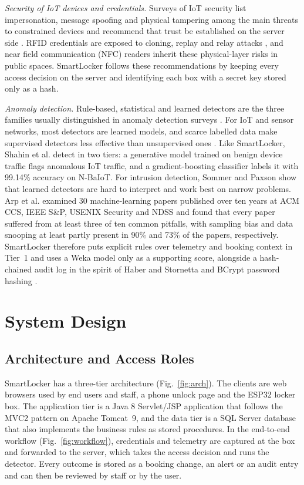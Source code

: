 \documentclass[journal,onecolumn]{IEEEtran}
\begin{document}
\textit{Security of IoT devices and credentials.} Surveys of IoT security list impersonation, message spoofing and
physical tampering among the main threats to constrained devices \cite{roman2013features} and recommend that trust be
established on the server side \cite{sicari2015security}. RFID credentials are exposed to cloning, replay and relay
attacks \cite{mitrokotsa2010rfid}, and near field communication (NFC) readers inherit these physical-layer risks in
public spaces. SmartLocker follows these recommendations by keeping every
access decision on the server and identifying each box with a secret key stored only as a hash.

\textit{Anomaly detection.} Rule-based, statistical and learned detectors are the three families usually distinguished
in anomaly detection surveys \cite{chandola2009anomaly}. For IoT and sensor networks, most detectors are learned
models, and scarce labelled data make supervised detectors less effective than unsupervised ones
\cite{demedeiros2023anomaly}. Like SmartLocker, Shahin et al. \cite{shahin2025twostage} detect in two
tiers: a generative model trained on benign device traffic flags anomalous IoT traffic, and a gradient-boosting
classifier labels it with 99.14\% accuracy on N-BaIoT. For intrusion detection, Sommer and Paxson
\cite{sommer2010outside} show that learned detectors are hard to interpret and work best on narrow problems. Arp et
al. \cite{arp2022dos} examined 30 machine-learning papers published over ten years at ACM CCS, IEEE S\&P, USENIX
Security and NDSS and found that every paper suffered from at least three of ten common pitfalls, with sampling bias
and data snooping at least partly present in 90\% and 73\% of the papers, respectively. SmartLocker therefore puts
explicit rules over telemetry and booking context in Tier~1 and uses a Weka model \cite{hall2009weka} only as a
supporting score, alongside a hash-chained audit log in the spirit of Haber and Stornetta \cite{haber1991timestamp}
and BCrypt password hashing \cite{provos1999bcrypt}.

\section{System Design}

\subsection{Architecture and Access Roles}

SmartLocker has a three-tier architecture (Fig.~\ref{fig:arch}). The clients are web browsers used by end users and
staff, a phone unlock page and the ESP32 locker box. The application tier is a Java 8 Servlet/JSP application that
follows the MVC2 pattern on Apache Tomcat~9, and the data tier is a SQL Server database that also implements the
business rules as stored procedures. In the end-to-end workflow (Fig.~\ref{fig:workflow}), credentials and telemetry
are captured at the box and forwarded to the server, which takes the access decision and runs the detector. Every
outcome is stored as a booking change, an alert or an audit entry and can then be reviewed by staff or by the user.
\end{document}

